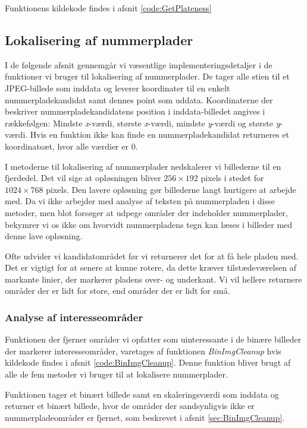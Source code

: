 Funktionens kildekode findes i afsnit \vref{code:GetPlateness}


\subsection{Lokalisering af nummerplader}
I de følgende afsnit gennemgår vi væsentlige implementeringsdetaljer i de funktioner vi bruger til lokalisering af nummerplader. De tager alle stien til et JPEG-billede som inddata og leverer koordinater til en enkelt nummerpladekandidat samt dennes point som uddata. Koordinaterne der beskriver nummerpladekandidatens position i inddata-billedet angives i rækkefølgen: Mindste \textit{x}-værdi, største \textit{x}-værdi, mindste \textit{y}-værdi og største \textit{y}-værdi. Hvis en funktion ikke kan finde en nummerpladekandidat returneres et koordinatsæt, hvor alle værdier er $0$.

I metoderne til lokalisering af nummerplader nedskalerer vi billederne til en fjerdedel. Det vil sige at opløsningen bliver $256 \times 192$ pixels i stedet for $1024 \times 768$ pixels. Den lavere opløsning gør billederne langt hurtigere at arbejde med. Da vi ikke arbejder med analyse af teksten på nummerpladen i disse metoder, men blot forsøger at udpege områder der indeholder nummerplader, bekymrer vi os ikke om hvorvidt nummerpladens tegn kan læses i billeder med denne lave opløsning.

Ofte udvider vi kandidatområdet før vi returnerer det for at få hele pladen med. Det er vigtigt for at senere at kunne rotere, da dette kræver tilstædeværelsen af markante linier, der markerer pladens over- og underkant. Vi vil hellere returnere områder der er lidt for store, end områder der er lidt for små.



\subsubsection{Analyse af interesseområder}
\label{sec:imp:BinImgCleanup}
Funktionen der fjerner områder vi opfatter som uinteressante i de binære billeder der markerer interesseområder, varetages af funktionen \textit{BinImgCleanup} hvis kildekode findes i afsnit \vref{code:BinImgCleanup}. Denne funktion bliver brugt af alle de fem metoder vi bruger til at lokalisere nummerplader.

Funktionen tager et binært billede samt en skaleringsværdi som inddata og returner et binært billede, hvor de områder der sandsynligvis ikke er nummerpladeområder er fjernet, som beskrevet i afsnit \vref{sec:BinImgCleanup}.

